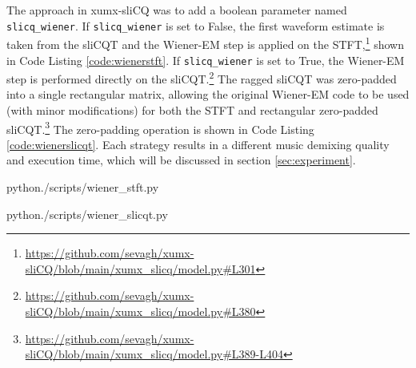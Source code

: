 \documentclass[report.tex]{subfiles}
\begin{document}
The approach in xumx-sliCQ was to add a boolean parameter named \Verb#slicq_wiener#. If \Verb#slicq_wiener# is set to False, the first waveform estimate is taken from the sliCQT and the Wiener-EM step is applied on the STFT,\footnote{\url{https://github.com/sevagh/xumx-sliCQ/blob/main/xumx_slicq/model.py\#L301}} shown in Code Listing \ref{code:wienerstft}. If \Verb#slicq_wiener# is set to True, the Wiener-EM step is performed directly on the sliCQT.\footnote{\url{https://github.com/sevagh/xumx-sliCQ/blob/main/xumx_slicq/model.py\#L380}} The ragged sliCQT was zero-padded into a single rectangular matrix, allowing the original Wiener-EM code to be used (with minor modifications) for both the STFT and rectangular zero-padded sliCQT.\footnote{\url{https://github.com/sevagh/xumx-sliCQ/blob/main/xumx_slicq/model.py\#L389-L404}} The zero-padding operation is shown in Code Listing \ref{code:wienerslicqt}. Each strategy results in a different music demixing quality and execution time, which will be discussed in section \ref{sec:experiment}. 

\begin{listing}[ht]
  \centering
\begin{inputminted}[linenos,breaklines,frame=single,fontsize=\scriptsize]{python}{./scripts/wiener_stft.py}
\end{inputminted}
  \caption{Using the STFT in the Wiener-EM post-processing step}
  \label{code:wienerstft}
\end{listing}

\begin{listing}[ht]
  \centering
\begin{inputminted}[linenos,breaklines,frame=single,fontsize=\scriptsize]{python}{./scripts/wiener_slicqt.py}
\end{inputminted}
  \caption{Zero-padding the sliCQT for the Wiener-EM post-processing step}
  \label{code:wienerslicqt}
\end{listing}
\end{document}
